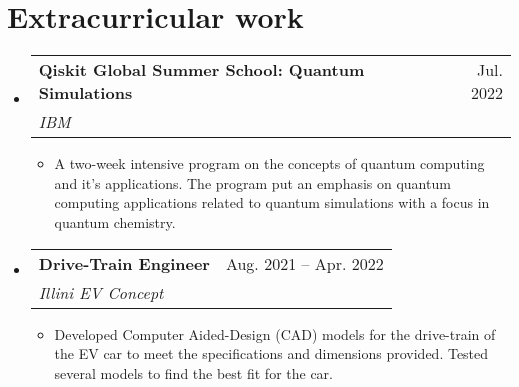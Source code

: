 \documentclass[letterpaper,11pt]{article}
\makeatletter
\newcommand{\resumeItem}[1]{
  \item\small{
    {#1 \vspace{-2pt}}
  }
}
\newcommand{\resumeSubheading}[4]{
  \vspace{-2pt}\item
    \begin{tabular*}{0.97\textwidth}[t]{l@{\extracolsep{\fill}}r}
      \textbf{#1} & #2 \\
      \textit{\small#3} & \textit{\small #4} \\
    \end{tabular*}\vspace{-7pt}
}
\newcommand{\resumeSubheading}[4]{
  \vspace{-2pt}\item
    \begin{tabular*}{0.97\textwidth}[t]{l@{\extracolsep{\fill}}r}
      \textbf{#1} & #2 \\
      \textit{\small#3} & \textit{\small #4} \\
    \end{tabular*}\vspace{-7pt}
}
\newcommand{\resumeSubHeadingListStart}{\begin{itemize}[leftmargin=0.15in, label={}]}
\newcommand{\resumeSubHeadingListEnd}{\end{itemize}}
\newcommand{\resumeItemListStart}{\begin{itemize}}
\newcommand{\resumeItemListEnd}{\end{itemize}\vspace{-5pt}}
\makeatother
\begin{document}
\section{Extracurricular work}
  \resumeSubHeadingListStart
  \resumeSubheading
      {Qiskit Global Summer School: Quantum Simulations}{Jul. 2022}
      {IBM}{~~~}
      \resumeItemListStart
        \resumeItem{A two-week intensive program on the concepts of quantum computing and it's applications. The program put an emphasis on quantum computing applications related to quantum simulations with a focus in quantum chemistry.}
      \resumeItemListEnd
    \resumeSubheading
      {Drive-Train Engineer}{Aug. 2021 -- Apr. 2022}
      {Illini EV Concept}{~~~}
      \resumeItemListStart
        \resumeItem{Developed Computer Aided-Design (CAD) models for the drive-train of the EV car to meet the specifications and dimensions provided. Tested several models to find the best fit for the car.}
      \resumeItemListEnd
      \resumeSubHeadingListEnd
\end{document}
